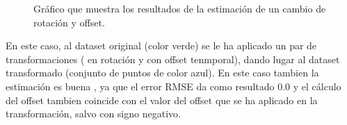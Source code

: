 \begin{figure}[H]
\begin{center}
\hspace{0.5cm}

\end{center}

\caption{Gráfico que muestra los resultados de la estimación de un cambio de rotación y offset.}
\end{figure}

En este caso, al dataset original (color verde) se le ha aplicado un par de transformaciones ( en rotación y con offset tenmporal), dando lugar al dataset transformado (conjunto de puntos de color azul). En este caso tambien la estimación es buena , ya que el error RMSE da como resultado 0.0 y el cálculo del offset tambien coincide con el valor del offset que se ha aplicado en la transformación, salvo con signo negativo.



